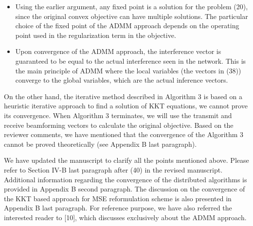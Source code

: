 \begin{enumerate}
\begin{itemize}
\item Using the earlier argument, any fixed point is a solution for the problem (20), since the original convex objective can have multiple solutions. The particular choice of the fixed point of the \ac{ADMM} approach depends on the operating point used in the regularization term in the objective.

\item Upon convergence of the \ac{ADMM} approach, the interference vector is guaranteed to be equal to the actual interference seen in the network. This is the main principle of \ac{ADMM} where the local variables (the vectors in (38)) converge to the global variables, which are the actual inference vectors.

\end{itemize}

On the other hand, the iterative method described in Algorithm 3 is based on a heuristic iterative approach to find a solution of \ac{KKT} equations, we cannot prove its convergence. When Algorithm 3 terminates, we will use the transmit and receive beamforming vectors to calculate the original objective. Based on the reviewer comments, we have mentioned that the convergence of the Algorithm 3 cannot be proved theoretically (see Appendix B last paragraph).

We have updated the manuscript to clarify all the points mentioned above. Please refer to Section IV-B last paragraph after (40) in the revised manuscript. Additional information regarding the convergence of the distributed algorithms is provided in Appendix B second paragraph. The discussion on the convergence of the KKT based approach for MSE reformulation scheme is also presented in Appendix B last paragraph. For reference purpose, we have also referred the interested reader to [10], which discusses exclusively about the \ac{ADMM} approach.


\end{enumerate}
